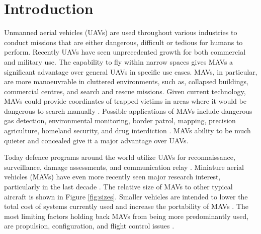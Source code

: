 \graphicspath{{./Figs/}}

\chapter{Introduction} 
\label{sec:Background}




Unmanned aerial vehicles (UAVs) are used throughout various industries to conduct missions that are either dangerous, difficult or tedious for humans to perform. Recently UAVs have seen unprecedented growth for both commercial \cite{Liu2014} and military \cite{Chaturvedi2019} \cite{Fan2018} use. The capability to fly within narrow spaces gives MAVs a significant advantage over general UAVs in specific use cases. MAVs, in particular, are more manoeuvrable in cluttered environments, such as, collapsed buildings, commercial centres, and search and rescue missions. Given current technology, MAVs could provide coordinates of trapped victims in areas where it would be dangerous to search manually  \cite{Valavanis2007}. Possible applications of MAVs include dangerous gas detection, environmental monitoring, border patrol, mapping, precision agriculture, homeland security, and drug interdiction \cite{Liu2014} \cite{Valavanis2007}. MAVs ability to be much quieter and concealed give it a major advantage over UAVs.


Today defence programs around the world utilize UAVs for reconnaissance, surveillance, damage assessments, and communication relay \cite{Chaturvedi2019} \cite{Fan2018} \cite{Valavanis2007}. Miniature aerial vehicles (MAVs) have even more recently seen major research interest, particularly in the last decade \cite{Valavanis2007}.  The relative size of MAVs to other typical aircraft is shown in Figure \ref{fig:sizes}. Smaller vehicles are intended to lower the total cost of systems currently used and increase the portability of MAVs \cite{Stephen2022}. The most limiting factors holding back MAVs from being more predominantly used, are propulsion, configuration, and flight control issues \cite{Stephen2022}.


